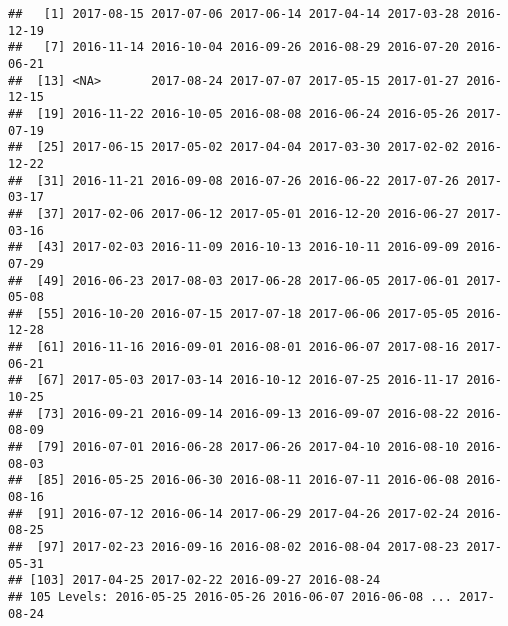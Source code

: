 \documentclass[
]{article}
\newenvironment{Shaded}{\begin{snugshade}}{\end{snugshade}}
\newcommand{\KeywordTok}[1]{\textcolor[rgb]{0.13,0.29,0.53}{\textbf{#1}}}
\newcommand{\NormalTok}[1]{#1}
\newcommand{\OperatorTok}[1]{\textcolor[rgb]{0.81,0.36,0.00}{\textbf{#1}}}
\begin{document}
\begin{Shaded}
\end{Shaded}

\begin{verbatim}
##   [1] 2017-08-15 2017-07-06 2017-06-14 2017-04-14 2017-03-28 2016-12-19
##   [7] 2016-11-14 2016-10-04 2016-09-26 2016-08-29 2016-07-20 2016-06-21
##  [13] <NA>       2017-08-24 2017-07-07 2017-05-15 2017-01-27 2016-12-15
##  [19] 2016-11-22 2016-10-05 2016-08-08 2016-06-24 2016-05-26 2017-07-19
##  [25] 2017-06-15 2017-05-02 2017-04-04 2017-03-30 2017-02-02 2016-12-22
##  [31] 2016-11-21 2016-09-08 2016-07-26 2016-06-22 2017-07-26 2017-03-17
##  [37] 2017-02-06 2017-06-12 2017-05-01 2016-12-20 2016-06-27 2017-03-16
##  [43] 2017-02-03 2016-11-09 2016-10-13 2016-10-11 2016-09-09 2016-07-29
##  [49] 2016-06-23 2017-08-03 2017-06-28 2017-06-05 2017-06-01 2017-05-08
##  [55] 2016-10-20 2016-07-15 2017-07-18 2017-06-06 2017-05-05 2016-12-28
##  [61] 2016-11-16 2016-09-01 2016-08-01 2016-06-07 2017-08-16 2017-06-21
##  [67] 2017-05-03 2017-03-14 2016-10-12 2016-07-25 2016-11-17 2016-10-25
##  [73] 2016-09-21 2016-09-14 2016-09-13 2016-09-07 2016-08-22 2016-08-09
##  [79] 2016-07-01 2016-06-28 2017-06-26 2017-04-10 2016-08-10 2016-08-03
##  [85] 2016-05-25 2016-06-30 2016-08-11 2016-07-11 2016-06-08 2016-08-16
##  [91] 2016-07-12 2016-06-14 2017-06-29 2017-04-26 2017-02-24 2016-08-25
##  [97] 2017-02-23 2016-09-16 2016-08-02 2016-08-04 2017-08-23 2017-05-31
## [103] 2017-04-25 2017-02-22 2016-09-27 2016-08-24
## 105 Levels: 2016-05-25 2016-05-26 2016-06-07 2016-06-08 ... 2017-08-24
\end{verbatim}
\end{document}
